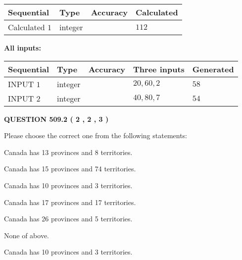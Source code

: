 \documentclass[12pt]{article}
\begin{document}
   
  
  
\noindent\begin{tabular}{|l|l|l|l|}
\hline
 Sequential & Type & Accuracy & Calculated \\ 
\hline
 
 
  Calculated $  1 $ & integer &  & 
  $ 112 $ 
 \\  \hline  
 \end{tabular}
   
   
   
   
\noindent\vspace{0.1in}\hspace{-0.08in} {\textbf{\Large{All inputs: }}}
   
   
  
  
\noindent\begin{tabular}{|l|l|l|l|l|}
\hline
 Sequential & Type & Accuracy & Three inputs & Generated \\ 
\hline
 
 
  INPUT $  1 $ & integer &  & $
 20
 , 
 60
 , 
 2
 $ & $ 58 $ 
 \\  \hline  
 
 
  INPUT $  2 $ & integer &  & $
 40
 , 
 80
 , 
 7
 $ & $ 54 $ 
 \\  \hline  
 \end{tabular}
   
   
  
\vspace{0.2in}
  
{\textbf{\Large{QUESTION
509.2 
 ( 2 , 2 , 3 )
}}}
  
  
Please choose the correct one from the following statements:
 
 
Canada has  13 provinces and  8 territories.
 
 
Canada has  15 provinces and  74 territories.
 
 
Canada has 10  provinces and 3 territories.
 
 
Canada has  17 provinces and  17 territories.
 
 
Canada has  26 provinces and  5 territories.
 
 
 None of above.
 
 
\noindent{}
 
 
Canada has 10  provinces and 3 territories.
 
\end{document}
